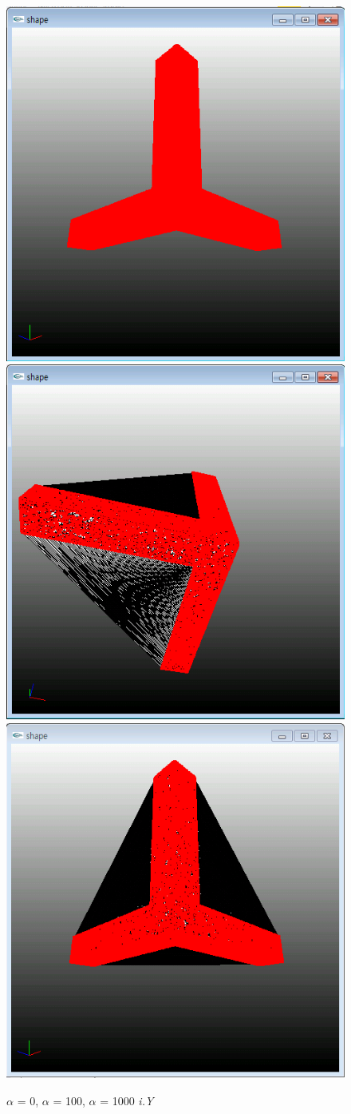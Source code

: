 \documentclass[11pt]{article}
\begin{document}
\begin{figure}[ht]
\includegraphics[width=.5\textwidth]{FIGS/alpha0-iY}
\hspace{1cm}
\includegraphics[width=.5\textwidth]{FIGS/alpha100-iY}
\vspace{1cm}
\includegraphics[width=.5\textwidth]{FIGS/alpha1000-iY}
\caption{$\alpha$ = 0, $\alpha$ = 100, $\alpha$ = 1000 \textit{i.Y}}
\end{figure}
\end{document}
